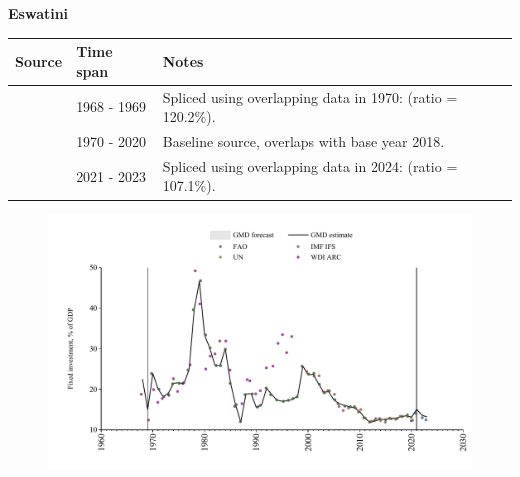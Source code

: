 \documentclass[12pt,a4paper,landscape]{article}
\begin{document}
\begin{adjustbox}{max totalsize={\paperwidth}{\paperheight},center}
\begin{minipage}[t][\textheight][t]{\textwidth}
\vspace*{0.5cm}
{}
\begin{center}
{\Large\bfseries Eswatini}
\end{center}
\vspace{0.5cm}
\begin{table}[H]
\centering
\small
\begin{tabular}{|l|l|l|}
\hline
\textbf{Source} & \textbf{Time span} & \textbf{Notes} \\
\hline
\rowcolor{white}\cite{WDI_ARC}& 1968 - 1969 &Spliced using overlapping data in 1970: (ratio = 120.2\%).\\
\rowcolor{lightgray}\cite{UN}& 1970 - 2020 &Baseline source, overlaps with base year 2018.\\
\rowcolor{white}\cite{FAO}& 2021 - 2023 &Spliced using overlapping data in 2024: (ratio = 107.1\%).\\
\hline
\end{tabular}
\end{table}
\begin{figure}[H]
\centering
\includegraphics[width=\textwidth,height=0.6\textheight,keepaspectratio]{graphs/SWZ_finv_GDP.pdf}
\end{figure}
\end{minipage}
\end{adjustbox}
\end{document}
